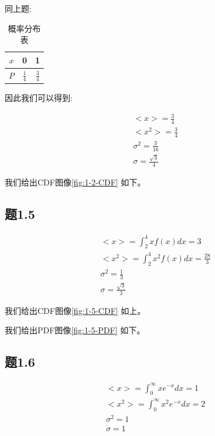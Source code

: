 \documentclass{article}
\begin{document}
	同上题:
	
	\begin{table}[ht]
	\centering
	\caption{概率分布表}
	\begin{tabular}{|c|c|c|}
		\hline
		$x$ & 0 & 1\\
		\hline
		$P$ & $\frac{1}{4}$ & $\frac{3}{4}$  \\
		\hline
	\end{tabular}
	\end{table}	
	
	因此我们可以得到:

	\begin{equation*}
	\begin{split}
		&<x>=\frac{3}{4}\\
		&<x^2>=\frac{3}{4}\\
		&\sigma^2=\frac{3}{16}\\
		&\sigma=\frac{\sqrt{3}}{4}
	\end{split}
	\end{equation*}	
	
	我们给出CDF图像\ref{fig:1-2-CDF} 如下。
	
	\subsection*{题1.5}
	\begin{equation*}
		\begin{split}
			&<x>=\int_2^4 xf(x)dx = 3\\
			&<x^2>=\int_2^4 x^2f(x)dx = \frac{28}{3}\\
			&\sigma^2 = \frac{1}{3}\\
			&\sigma = \frac{\sqrt{3}}{3}
		\end{split}
	\end{equation*}
	
	我们给出CDF图像\ref{fig:1-5-CDF} 如上。
	
	我们给出PDF图像\ref{fig:1-5-PDF} 如下。


	\subsection*{题1.6}
	\begin{equation*}
		\begin{split}
			&<x>=\int_0^\infty xe^{-x}dx = 1\\
			&<x^2>=\int_0^\infty x^2e^{-x}dx = 2\\
			&\sigma^2 = 1\\
			&\sigma = 1
		\end{split}
	\end{equation*}
\end{document}
